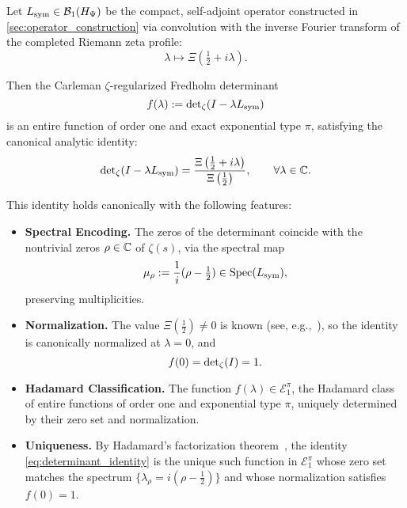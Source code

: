 \begin{theorem}
\label{thm:det_identity_revised}
\leavevmode
\begin{tcolorbox}[colback=gray!3!white,colframe=black!75!white,title={\textbf{Canonical Determinant Identity}}]
Let \( L_{\mathrm{sym}} \in \mathcal{B}_1(H_{\Psi}) \) be the compact, self-adjoint operator constructed in \cref{sec:operator_construction} via convolution with the inverse Fourier transform of the completed Riemann zeta profile:
\[
\lambda \mapsto \Xi\left( \tfrac{1}{2} + i\lambda \right).
\]

\medskip

Then the Carleman \(\zeta\)-regularized Fredholm determinant
\[
f(\lambda) := \det\nolimits_{\zeta}(I - \lambda L_{\mathrm{sym}})
\]
is an entire function of order one and exact exponential type \( \pi \), satisfying the canonical analytic identity:
\begin{equation}
\det\nolimits_{\zeta}(I - \lambda L_{\mathrm{sym}})
= \frac{\Xi\left( \tfrac{1}{2} + i\lambda \right)}{\Xi\left( \tfrac{1}{2} \right)},
\qquad \forall \lambda \in \mathbb{C}.
\label{eq:determinant_identity}
\end{equation}

\medskip

This identity holds canonically with the following features:
\begin{itemize}
  \item \textbf{Spectral Encoding.} The zeros of the determinant coincide with the nontrivial zeros \( \rho \in \mathbb{C} \) of \( \zeta(s) \), via the spectral map
  \[
  \mu_\rho := \frac{1}{i}(\rho - \tfrac{1}{2}) \in \operatorname{Spec}(L_{\mathrm{sym}}),
  \]
  preserving multiplicities.

  \item \textbf{Normalization.} The value \( \Xi(\tfrac{1}{2}) \ne 0 \) is known (see, e.g.,~\cite[Thm.~2.3]{Titchmarsh1986Zeta}), so the identity is canonically normalized at \( \lambda = 0 \), and
  \[
  f(0) = \det\nolimits_{\zeta}(I) = 1.
  \]

  \item \textbf{Hadamard Classification.} The function \( f(\lambda) \in \mathcal{E}_1^\pi \), the Hadamard class of entire functions of order one and exponential type \( \pi \), uniquely determined by their zero set and normalization.

  \item \textbf{Uniqueness.} By Hadamard’s factorization theorem~\cite[Ch.~3]{Levin1996EntireLectures}, the identity \eqref{eq:determinant_identity} is the unique such function in \( \mathcal{E}_1^\pi \) whose zero set matches the spectrum \( \{ \lambda_\rho = i(\rho - \tfrac{1}{2}) \} \) and whose normalization satisfies \( f(0) = 1 \).
\end{itemize}
\end{tcolorbox}
\end{theorem}
